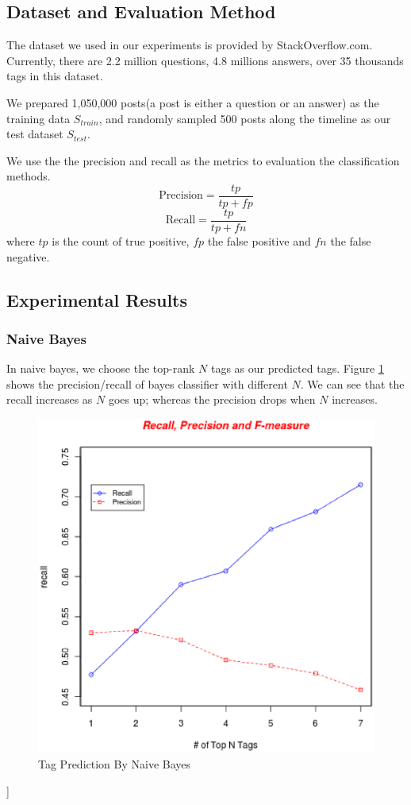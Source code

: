 
\subsection{Dataset and Evaluation Method}
The dataset we used in our experiments is provided by StackOverflow.com. Currently, there are 2.2 million questions, 4.8 millions answers, over 35 thousands tags in this dataset\cite{DataDump}.

We prepared 1,050,000 posts(a post is either a question or an answer)  as the training data $S_{train}$, and randomly sampled 500 posts along the timeline as our test dataset $S_{test}$.

We use the the precision and recall as the metrics to evaluation the classification methods.
$$ \text{Precision}=\frac{tp}{tp+fp} $$
$$ \text{Recall}=\frac{tp}{tp+fn} $$
where $tp$ is the count of true positive, $fp$ the false positive and $fn$ the false negative.

\subsection{Experimental Results}
\subsubsection{Naive Bayes}
In naive bayes, we choose the top-rank $N$ tags as our predicted tags. Figure \ref{fig:naive} shows the precision/recall of bayes classifier with different $N$. We can see that the recall increases as $N$ goes up; whereas the precision drops when $N$ increases.

\begin{figure}[htb!]
\centering%
    \includegraphics[scale=0.5]{naives.eps}
\caption{Tag Prediction By Naive Bayes}
\label{fig:naive}
\end{figure}]


